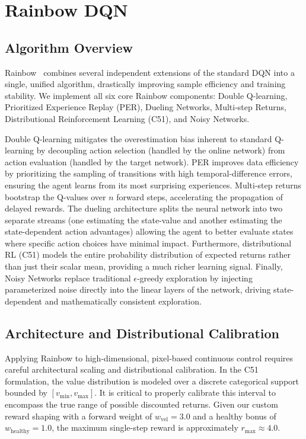 \section{Rainbow DQN}
\label{sec:rainbow}

\subsection{Algorithm Overview}

Rainbow~\cite{hessel2018rainbow} combines several independent extensions of the standard DQN into a single, unified algorithm, drastically improving sample efficiency and training stability. We implement all six core Rainbow components: Double Q-learning, Prioritized Experience Replay (PER), Dueling Networks, Multi-step Returns, Distributional Reinforcement Learning (C51), and Noisy Networks. 

Double Q-learning mitigates the overestimation bias inherent to standard Q-learning by decoupling action selection (handled by the online network) from action evaluation (handled by the target network). PER improves data efficiency by prioritizing the sampling of transitions with high temporal-difference errors, ensuring the agent learns from its most surprising experiences. Multi-step returns bootstrap the Q-values over $n$ forward steps, accelerating the propagation of delayed rewards. The dueling architecture splits the neural network into two separate streams (one estimating the state-value and another estimating the state-dependent action advantages) allowing the agent to better evaluate states where specific action choices have minimal impact. Furthermore, distributional RL (C51) models the entire probability distribution of expected returns rather than just their scalar mean, providing a much richer learning signal. Finally, Noisy Networks replace traditional $\epsilon$-greedy exploration by injecting parameterized noise directly into the linear layers of the network, driving state-dependent and mathematically consistent exploration.

\subsection{Architecture and Distributional Calibration}

Applying Rainbow to high-dimensional, pixel-based continuous control requires careful architectural scaling and distributional calibration. In the C51 formulation, the value distribution is modeled over a discrete categorical support bounded by $[v_{\min}, v_{\max}]$. It is critical to properly calibrate this interval to encompass the true range of possible discounted returns. Given our custom reward shaping with a forward weight of $w_{\text{vel}} = 3.0$ and a healthy bonus of $w_{\text{healthy}} = 1.0$, the maximum single-step reward is approximately $r_{\max} \approx 4.0$. 

